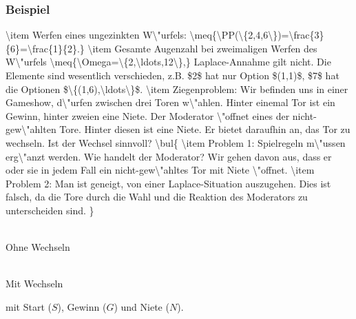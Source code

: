 \subsubsection{Beispiel}
\num{
\item Werfen eines ungezinkten W\"urfels:
\meq{\PP(\{2,4,6\})=\frac{3}{6}=\frac{1}{2}.}
\item Gesamte Augenzahl bei zweimaligen Werfen des W\"urfels
\meq{\Omega=\{2,\ldots,12\},}
Laplace-Annahme gilt nicht. Die Elemente sind wesentlich verschieden, z.B. $2$ hat nur Option $(1,1)$, $7$ hat die Optionen $\{(1,6),\ldots\}$.
\item Ziegenproblem: Wir befinden uns in einer Gameshow, d\"urfen zwischen drei Toren w\"ahlen. Hinter einemal Tor ist ein Gewinn, hinter zweien eine Niete. Der Moderator \"offnet eines der nicht-gew\"ahlten Tore. Hinter diesen ist eine Niete. Er bietet daraufhin an, das Tor zu wechseln. Ist der Wechsel sinnvoll?
\bul{
\item Problem 1: Spielregeln m\"ussen erg\"anzt werden. Wie handelt der Moderator? Wir gehen davon aus, dass er oder sie in jedem Fall ein nicht-gew\"ahltes Tor mit Niete \"offnet.
\item Problem 2: Man ist geneigt, von einer Laplace-Situation auszugehen. Dies ist falsch, da die Tore durch die Wahl und die Reaktion des Moderators zu unterscheiden sind.
}
}
\begin{center}
\begin{minipage}{0.45\textwidth}
\centering
{}\\
Ohne Wechseln
\end{minipage}
\begin{minipage}{0.45\textwidth}
\centering
{}\\
Mit Wechseln
\end{minipage}
\end{center}
mit Start ($S$), Gewinn ($G$) und Niete ($N$).
